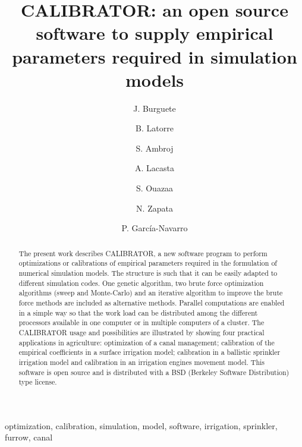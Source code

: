 \documentclass[review,authoryear]{elsarticle}
\begin{document}
\title{CALIBRATOR: an open source software to supply empirical parameters required
in simulation models}

\author[eead,bifi]{J. Burguete}

\author[eead]{B. Latorre}

\author[kit]{S. Ambroj}

\author[unizar]{A. Lacasta}

\author[eead]{S. Ouazaa}

\author[eead]{N. Zapata}

\author[unizar]{P. García-Navarro}


\address[eead]{Soil and Water, EEAD / CSIC.
P.O. Box 13034, 50080~Zaragoza, Spain.}
\address[bifi]{BIFI: Instituto de Biocomputación y Física de Sistemas Complejos,
Universidad de Zaragoza.
Mariano Esquillor, Edificio I+D, 50009~Zaragoza, Spain.}
\address[kit]{Steinbuch Centre for Computing (SCC),
Karlsruhe Institute of Technology (KIT).
KIT-Campus Nord, Hermann von Helmholtzplatz 1, 76344 Eggenstein - Leopoldshafen,
Germany.}
\address[unizar]{Fluid Mechanics, LIFTEC, CSIC-Universidad de Zaragoza.
María de Luna 3, 50018~Zaragoza, Spain.}

\begin{keyword}
optimization, calibration, simulation, model, software, irrigation, sprinkler,
furrow, canal
\end{keyword}

\begin{abstract}
The present work describes CALIBRATOR, a new software program to perform
optimizations or calibrations of empirical parameters required in the
formulation of numerical simulation models. The structure is such that it can be
easily adapted to different simulation codes.
One genetic algorithm, two brute force optimization algorithms (sweep and
Monte-Carlo) and an iterative algorithm to improve the brute force methods are
included as alternative methods.
Parallel computations are enabled in a simple way so that the work load can be
distributed among the different processors available in one computer or in
multiple computers of a cluster.
The CALIBRATOR usage and possibilities are illustrated by showing four practical
applications in agriculture: optimization of a canal management; calibration of
the empirical coefficients in a surface irrigation model; calibration in a
ballistic sprinkler irrigation model and calibration in an irrigation engines
movement model.
This software is open source and is distributed with a BSD (Berkeley Software
Distribution) type license.
\end{abstract}
\end{document}

